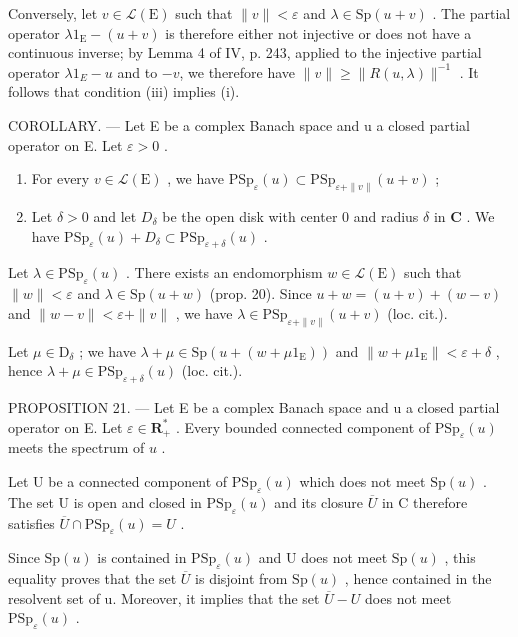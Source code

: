 Conversely, let \(v \in \mathcal{L}(\mathrm{E})\) such that \(\|v\| < \varepsilon\) and \(\lambda \in \mathrm{Sp}(u + v)\) . The partial operator \(\lambda1_{\mathrm{E}} - (u + v)\) is therefore either not injective or does not have a continuous inverse; by Lemma 4 of IV, p. 243, applied to the injective partial operator \(\lambda1_{E} - u\) and to \(-v\), we therefore have \(\|v\| \geqslant \|R(u, \lambda)\|^{-1}\) . It follows that condition (iii) implies (i).

COROLLARY. — Let E be a complex Banach space and u a closed partial operator on E. Let \(\varepsilon > 0\) .

\begin{enumerate}
\def\labelenumi{\alph{enumi})}
\item
  For every \(v \in \mathcal{L}(\mathrm{E})\) , we have \(\mathrm{PSp}_{\varepsilon}(u) \subset \mathrm{PSp}_{\varepsilon + \| v\|}(u + v)\) ;
\item
  Let \(\delta > 0\) and let \(D_{\delta}\) be the open disk with center 0 and radius \(\delta\) in \(\mathbf{C}\) . We have \(\mathrm{PSp}_{\varepsilon}(u) + D_{\delta} \subset \mathrm{PSp}_{\varepsilon + \delta}(u)\) .
\end{enumerate}

Let \(\lambda \in \mathrm{PSp}_{\varepsilon}(u)\) . There exists an endomorphism \(w \in \mathcal{L}(\mathrm{E})\) such that \(\|w\| < \varepsilon\) and \(\lambda \in \mathrm{Sp}(u+w)\) (prop. 20). Since \(u+w = (u+v)+(w-v)\) and \(\|w-v\| < \varepsilon + \|v\|\) , we have \(\lambda \in \mathrm{PSp}_{\varepsilon+ \|v\|}(u+v)\) (loc. cit.).

Let \(\mu \in \mathrm{D}_{\delta}\) ; we have \(\lambda + \mu \in \mathrm{Sp}(u + (w + \mu 1_{\mathrm{E}}))\) and \(\| w + \mu 1_{\mathrm{E}} \| < \varepsilon + \delta\) , hence \(\lambda + \mu \in \mathrm{PSp}_{\varepsilon + \delta}(u)\) (loc. cit.).

PROPOSITION 21. --- Let E be a complex Banach space and u a closed partial operator on E. Let \(\varepsilon\in\mathbf{R}_{+}^{*}\) . Every bounded connected component of \(\mathrm{PSp}_{\varepsilon}(u)\) meets the spectrum of \(u\) .

Let U be a connected component of \(\mathrm{PSp}_{\varepsilon}(u)\) which does not meet \(\mathrm{Sp}(u)\) . The set U is open and closed in \(\mathrm{PSp}_{\varepsilon}(u)\) and its closure \(\overline{U}\) in C therefore satisfies \(\overline{U} \cap \mathrm{PSp}_{\varepsilon}(u) = U\) .

Since \(\mathrm{Sp}(u)\) is contained in \(\mathrm{PSp}_{\varepsilon}(u)\) and U does not meet \(\mathrm{Sp}(u)\) , this equality proves that the set \(\overline{U}\) is disjoint from \(\mathrm{Sp}(u)\) , hence contained in the resolvent set of u. Moreover, it implies that the set \(\overline{U}-U\) does not meet \(\mathrm{PSp}_{\varepsilon}(u)\) .

